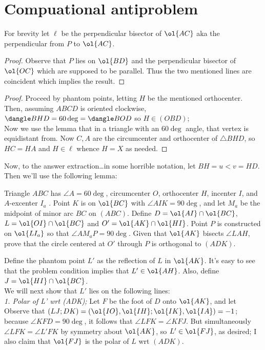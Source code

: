 \documentclass{seto}
\begin{document}
\section{Compuational antiproblem}
For brevity let $\ell$ be the perpendicular bisector of $\ol{AC}$ aka the perpendicular from $P$ to $\ol{AC}$. 
\begin{proof}
Observe that $P$ lies on $\ol{BD}$ and the perpendicular bisector of $\ol{OC}$ which are supposed to be parallel. Thus the two mentioned lines are coincident which implies the result.
\end{proof}
\begin{proof}
Proceed by phantom points, letting $H$ be the mentioned orthocenter. Then, assuming $ABCD$ is oriented clockwise, $\dangle BHD=60\deg=\dangle BOD$ so $H\in(OBD)$;\\
Now we use the lemma that in a triangle with an $60\deg$ angle, that vertex is equidistant from.
Now $C,A$ are the circumcenter and orthocenter of $\triangle BHD$, so $HC=HA$ and $H\in\ell$ whence $H=X$ as needed.
\end{proof}
Now, to the answer extraction\dots in some horrible notation, let $BH=u<v=HD$. Then we'll use the following lemma:
\begin{block}[Problem]
Triangle $ABC$ has $\angle A=60\deg$, circumcenter $O$, orthocenter $H$, incenter $I$, and $A$-excenter $I_a$ . Point $K$ is on $\ol{BC}$ with $\angle AIK=90\deg$, and let $M_a$ be the midpoint of minor arc $BC$ on $(ABC)$. Define $D=\ol{AI}\cap\ol{BC}$, $L=\ol{OI}\cap\ol{BC}$ and $O'=\ol{AK}\cap\ol{HI}$. Point $P$ is constructed on $\ol{LI_a}$ so that $\angle AM_aP=90\deg$. Given that $\ol{AK}$ bisects $\angle LAH$, prove that the circle centered at $O'$ through $P$ is orthogonal to $(ADK)$.
\end{block}
Define the phantom point $L'$ as the reflection of $L$ in $\ol{AK}$. It's easy to see that the problem condition implies that $L'\in\ol{AH}$. Also, define $J=\ol{HI}\cap\ol{BC}$.\\
We will next show that $L'$ lies on the following lines:
\\[4pt]
\emph{1. Polar of L' wrt (ADK); }Let $F$ be the foot of $D$ onto $\ol{AK}$, and let 
Observe that $(LJ;DK)=(\ol{IO},\ol{IH};\ol{IK},\ol{IA})=-1$; because $\angle KFD=90\deg$, it follows that $\angle LFK=\angle KFJ$. But simultaneously $\angle LFK=\angle L'FK$ by symmetry about $\ol{AK}$, so $L'\in\ol{FJ}$, as desired;
I also claim that $\ol{FJ}$ is the polar of $L$ wrt $(ADK)$.
\end{document}
